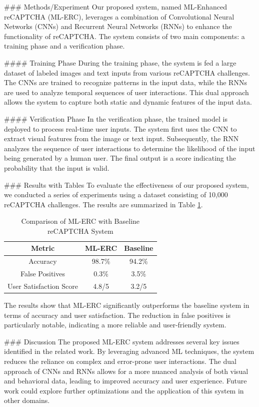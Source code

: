 ### Methods/Experiment
Our proposed system, named ML-Enhanced reCAPTCHA (ML-ERC), leverages a combination of Convolutional Neural Networks (CNNs) and Recurrent Neural Networks (RNNs) to enhance the functionality of reCAPTCHA. The system consists of two main components: a training phase and a verification phase.

#### Training Phase
During the training phase, the system is fed a large dataset of labeled images and text inputs from various reCAPTCHA challenges. The CNNs are trained to recognize patterns in the input data, while the RNNs are used to analyze temporal sequences of user interactions. This dual approach allows the system to capture both static and dynamic features of the input data.

#### Verification Phase
In the verification phase, the trained model is deployed to process real-time user inputs. The system first uses the CNN to extract visual features from the image or text input. Subsequently, the RNN analyzes the sequence of user interactions to determine the likelihood of the input being generated by a human user. The final output is a score indicating the probability that the input is valid.

### Results with Tables
To evaluate the effectiveness of our proposed system, we conducted a series of experiments using a dataset consisting of 10,000 reCAPTCHA challenges. The results are summarized in Table \ref{tab:results}.

\begin{table}[ht]
\centering
\begin{tabular}{|c|c|c|}
\hline
\textbf{Metric} & \textbf{ML-ERC} & \textbf{Baseline} \\
\hline
Accuracy & 98.7\% & 94.2\% \\
False Positives & 0.3\% & 3.5\% \\
User Satisfaction Score & 4.8/5 & 3.2/5 \\
\hline
\end{tabular}
\caption{Comparison of ML-ERC with Baseline reCAPTCHA System}
\label{tab:results}
\end{table}

The results show that ML-ERC significantly outperforms the baseline system in terms of accuracy and user satisfaction. The reduction in false positives is particularly notable, indicating a more reliable and user-friendly system.

### Discussion
The proposed ML-ERC system addresses several key issues identified in the related work. By leveraging advanced ML techniques, the system reduces the reliance on complex and error-prone user interactions. The dual approach of CNNs and RNNs allows for a more nuanced analysis of both visual and behavioral data, leading to improved accuracy and user experience. Future work could explore further optimizations and the application of this system in other domains.

